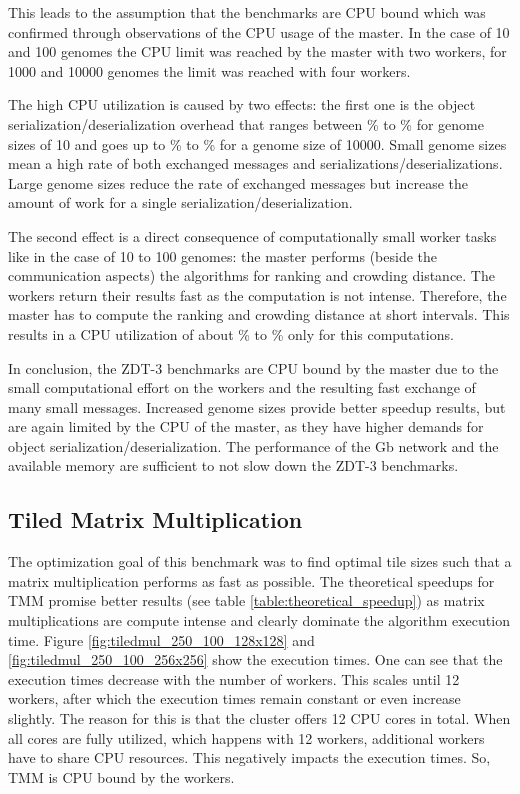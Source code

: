 This leads to the assumption that the benchmarks are CPU bound which was confirmed through observations of the CPU usage of the master. In the case of 10 and 100 genomes the CPU limit was reached by the master with two workers, for 1000 and 10000 genomes the limit was reached with four workers.

The high CPU utilization is caused by two effects: the first one is the object serialization/deserialization overhead that ranges between \unit[30]{\%} to \unit[40]{\%} for genome sizes of 10 and goes up to \unit[60]{\%} to \unit[70]{\%} for a genome size of 10000. Small genome sizes mean a high rate of both exchanged messages and serializations/deserializations. Large genome sizes reduce the rate of exchanged messages but increase the amount of work for a single serialization/deserialization.

The second effect is a direct consequence of computationally small worker tasks like in the case of 10 to 100 genomes: the master performs (beside the communication aspects) the algorithms for ranking and crowding distance. The workers return their results fast as the computation is not intense. Therefore, the master has to compute the ranking and crowding distance at short intervals. This results in a CPU utilization of about \unit[25]{\%} to \unit[30]{\%} only for this computations.

In conclusion, the ZDT-3 benchmarks are CPU bound by the master due to the small computational effort on the workers and the resulting fast exchange of many small messages. Increased genome sizes provide better speedup results, but are again limited by the CPU of the master, as they have higher demands for object serialization/deserialization. The performance of the \unit[1]{Gb} network and the available memory are sufficient to not slow down the ZDT-3 benchmarks.

\subsection{Tiled Matrix Multiplication}
The optimization goal of this benchmark was to find optimal tile sizes such that a matrix multiplication performs as fast as possible. The theoretical speedups for TMM promise better results (see table \ref{table:theoretical_speedup}) as matrix multiplications are compute intense and clearly dominate the algorithm execution time. Figure \ref{fig:tiledmul_250_100_128x128} and \ref{fig:tiledmul_250_100_256x256} show the execution times. One can see that the execution times decrease with the number of workers. This scales until 12 workers, after which the execution times remain constant or even increase slightly. The reason for this is that the cluster offers 12 CPU cores in total. When all cores are fully utilized, which happens with 12 workers, additional workers have to share CPU resources. This negatively impacts the execution times. So, TMM is CPU bound by the workers.

